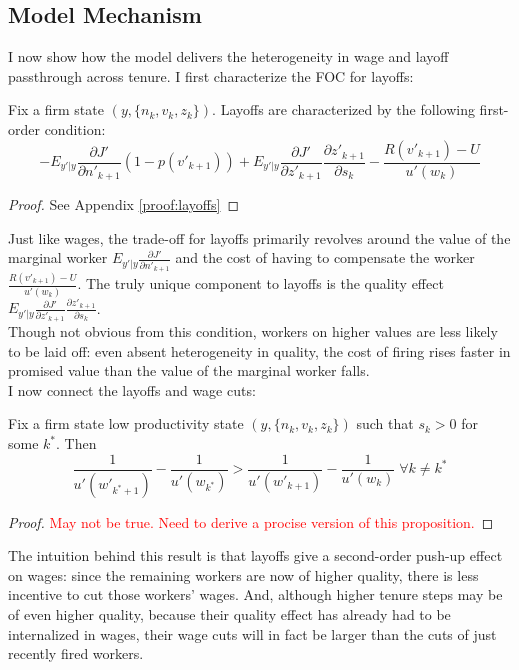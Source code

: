 \subsection{Model Mechanism}
I now show how the model delivers the heterogeneity in wage and layoff passthrough across tenure. 
I first characterize the FOC for layoffs:
\begin{proposition} \label{prop:layoffs}
  Fix a firm state $(y,\{n_k,v_k,z_k\})$. Layoffs are characterized by the following first-order condition:
  \begin{equation}
    -E_{y'|y}\frac{\partial J'}{\partial n'_{k+1}}(1-p(v'_{k+1}))+E_{y'|y}\frac{\partial J'}{\partial z'_{k+1}}\frac{\partial z'_{k+1}}{\partial s_k} - \frac{R(v'_{k+1})-U}{u'(w_k)}
  \end{equation}
\end{proposition}
\begin{proof}
  See Appendix \ref{proof:layoffs}
\end{proof}
Just like wages, the trade-off for layoffs primarily revolves around the value of the marginal worker $E_{y'|y}\frac{\partial J'}{\partial n'_{k+1}}$ and the cost of having to compensate the worker $\frac{R(v'_{k+1})-U}{u'(w_k)}$. The truly unique component to layoffs is the quality effect $E_{y'|y}\frac{\partial J'}{\partial z'_{k+1}}\frac{\partial z'_{k+1}}{\partial s_k}$. \\
Though not obvious from this condition, workers on higher values are less likely to be laid off: even absent heterogeneity in quality, the cost of firing rises faster in promised value than the value of the marginal worker falls. \\
I now connect the layoffs and wage cuts:
\begin{proposition} \label{prop:wage_cuts}
  Fix a firm state low productivity state $(y,\{n_k,v_k,z_k\})$ such that $s_k>0$ for some $k^*$. Then
  \[\frac{1}{u'(w'_{k^*+1})}-\frac{1}{u'(w_{k^*})} > \frac{1}{u'(w'_{k+1})}-\frac{1}{u'(w_k)} \; \forall k\neq k^*\]
\end{proposition}
\begin{proof}
  \textcolor{red}{May not be true. Need to derive a procise version of this proposition.}
\end{proof}
The intuition behind this result is that layoffs give a second-order push-up effect on wages: since the remaining workers are now of higher quality, there is less incentive to cut those workers' wages. And, although higher tenure steps may be of even higher quality, because their quality effect has already had to be internalized in wages, their wage cuts will in fact be larger than the cuts of just recently fired workers.